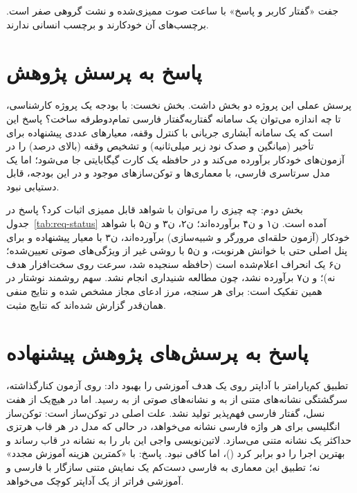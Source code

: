   جفت «گفتار کاربر و پاسخ» با  ساعت
صوت ممیزی‌شده و نشت گروهی صفر است. برچسب‌های آن خودکارند و برچسب انسانی
ندارند.

\section{پاسخ به پرسش پژوهش}
\label{sec:answer}

پرسش عملی این پروژه دو بخش داشت. بخش نخست: با بودجه یک پروژه کارشناسی، تا
چه اندازه می‌توان یک سامانه گفتار‌به‌گفتار فارسی تمام‌دوطرفه ساخت؟ پاسخ این
است که یک سامانه آبشاری جریانی با کنترل وقفه، معیارهای عددی پیشنهاده برای
تأخیر (میانگین و صدک نود زیر  میلی‌ثانیه) و تشخیص وقفه (بالای 
درصد) را در آزمون‌های خودکار برآورده می‌کند و در حافظه یک کارت 
گیگابایتی جا می‌شود؛ اما یک مدل سرتاسری فارسی، با معماری‌ها و توکن‌سازهای
موجود و در این بودجه، قابل دستیابی نبود.

بخش دوم: چه چیزی را می‌توان با شواهد قابل ممیزی اثبات کرد؟ پاسخ در
\mbox{جدول~\ref{tab:req-status}} آمده است. ن۱ و ن۴ برآورده‌اند؛ ن۲، ن۳ و ن۵
با شواهد خودکار (آزمون حلقه‌ای مرورگر و شبیه‌سازی) برآورده‌اند، ن۳ با معیار
پیشنهاده و برای پنل اصلی حتی با خوانش هر‌نوبت، و ن۵ با روشی غیر از ویژگی‌های
صوتی تعیین‌شده؛
ن۶ یک انحراف اعلام‌شده است (حافظه سنجیده شد، سرعت روی سخت‌افزار هدف نه)؛ و
ن۷ برآورده نشد، چون مطالعه شنیداری انجام نشد. سهم روشمند نوشتار در همین
تفکیک است: برای هر سنجه، مرز ادعای مجاز مشخص شده و نتایج منفی همان‌قدر
گزارش شده‌اند که نتایج مثبت.

\section{پاسخ به پرسش‌های پژوهش پیشنهاده}
\label{sec:rq-answers}

 تطبیق کم‌پارامتر
 با آداپتر  روی یک  هدف آموزشی را بهبود داد:
روی آزمون کنارگذاشته، سرگشتگی نشانه‌های متنی از  به  و
نشانه‌های صوتی از  به  رسید. اما در هیچ‌یک از هفت نسل،
گفتار فارسی فهم‌پذیر تولید نشد. علت اصلی در توکن‌ساز است: توکن‌ساز انگلیسی
برای هر واژه فارسی  نشانه می‌خواهد، در حالی که مدل در هر قاب
 هرتزی حداکثر یک نشانه متنی می‌سازد. لاتین‌نویسی واجی این بار را به
 نشانه در قاب رساند و بهترین اجرا را دو برابر کرد ()، اما کافی
نبود. پاسخ: با «کمترین هزینه آموزش مجدد» نه؛ تطبیق این معماری به فارسی دست‌کم
یک نمایش متنی سازگار با فارسی و آموزشی فراتر از یک آداپتر کوچک می‌خواهد.


